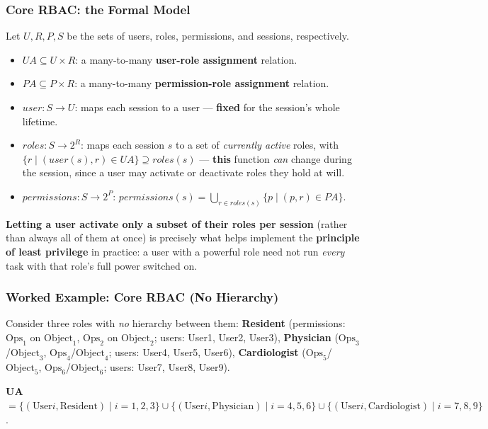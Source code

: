 \documentclass[12pt, a4paper]{article}
\begin{document}
\subsubsection{Core RBAC: the Formal Model}
Let $U, R, P, S$ be the sets of users, roles, permissions, and sessions, respectively.
\begin{itemize}
    \item $UA \subseteq U \times R$: a many-to-many \textbf{user-role assignment} relation.
    \item $PA \subseteq P \times R$: a many-to-many \textbf{permission-role assignment} relation.
    \item $\mathit{user}: S \to U$: maps each session to a user --- \textbf{fixed} for the session's whole lifetime.
    \item $\mathit{roles}: S \to 2^R$: maps each session $s$ to a set of \emph{currently active} roles, with $\{r \mid (\mathit{user}(s),r) \in UA\} \supseteq \mathit{roles}(s)$ --- \textbf{this} function \emph{can} change during the session, since a user may activate or deactivate roles they hold at will.
    \item $\mathit{permissions}: S \to 2^P$: $\mathit{permissions}(s) = \bigcup_{r \in \mathit{roles}(s)} \{p \mid (p,r) \in PA\}$.
\end{itemize}
\textcolor{blue!50!black}{\textbf{Letting a user activate only a subset of their roles per session}} (rather than always all of them at once) is precisely what helps implement the \textbf{principle of least privilege} in practice: a user with a powerful role need not run \emph{every} task with that role's full power switched on.

\subsubsection{Worked Example: Core RBAC (No Hierarchy)}
\label{subsec:rbac-core-exercise-08}
Consider three roles with \emph{no} hierarchy between them: \textbf{Resident} (permissions: $\text{Ops}_1$ on $\text{Object}_1$, $\text{Ops}_2$ on $\text{Object}_2$; users: User1, User2, User3), \textbf{Physician} ($\text{Ops}_3$/$\text{Object}_3$, $\text{Ops}_4$/$\text{Object}_4$; users: User4, User5, User6), \textbf{Cardiologist} ($\text{Ops}_5$/$\text{Object}_5$, $\text{Ops}_6$/$\text{Object}_6$; users: User7, User8, User9).

\textbf{UA} $= \{(\text{User}i,\text{Resident}) \mid i=1,2,3\} \cup \{(\text{User}i,\text{Physician}) \mid i=4,5,6\} \cup \{(\text{User}i,\text{Cardiologist}) \mid i=7,8,9\}$.
\end{document}
